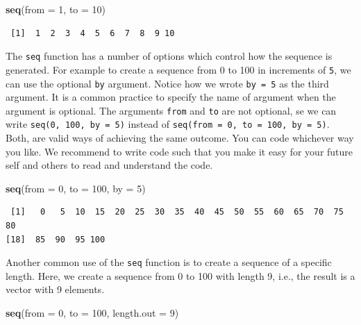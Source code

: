 \documentclass[]{book}
\newenvironment{Shaded}{\begin{snugshade}}{\end{snugshade}}
\newcommand{\KeywordTok}[1]{\textcolor[rgb]{0.13,0.29,0.53}{\textbf{#1}}}
\newcommand{\DataTypeTok}[1]{\textcolor[rgb]{0.13,0.29,0.53}{#1}}
\newcommand{\DecValTok}[1]{\textcolor[rgb]{0.00,0.00,0.81}{#1}}
\newcommand{\NormalTok}[1]{#1}
\theoremstyle{definition}
\theoremstyle{definition}
\theoremstyle{definition}
\theoremstyle{remark}
\begin{document}
\begin{Shaded}
\begin{Highlighting}[]
\KeywordTok{seq}\NormalTok{(}\DataTypeTok{from =} \DecValTok{1}\NormalTok{, }\DataTypeTok{to =} \DecValTok{10}\NormalTok{)}
\end{Highlighting}
\end{Shaded}

\begin{verbatim}
 [1]  1  2  3  4  5  6  7  8  9 10
\end{verbatim}

The \texttt{seq} function has a number of options which control how the
sequence is generated. For example to create a sequence from 0 to 100 in
increments of \texttt{5}, we can use the optional \texttt{by} argument.
Notice how we wrote \texttt{by\ =\ 5} as the third argument. It is a
common practice to specify the name of argument when the argument is
optional. The arguments \texttt{from} and \texttt{to} are not optional,
se we can write \texttt{seq(0,\ 100,\ by\ =\ 5)} instead of
\texttt{seq(from\ =\ 0,\ to\ =\ 100,\ by\ =\ 5)}. Both, are valid ways
of achieving the same outcome. You can code whichever way you like. We
recommend to write code such that you make it easy for your future self
and others to read and understand the code.

\begin{Shaded}
\begin{Highlighting}[]
\KeywordTok{seq}\NormalTok{(}\DataTypeTok{from =} \DecValTok{0}\NormalTok{, }\DataTypeTok{to =} \DecValTok{100}\NormalTok{, }\DataTypeTok{by =} \DecValTok{5}\NormalTok{)}
\end{Highlighting}
\end{Shaded}

\begin{verbatim}
 [1]   0   5  10  15  20  25  30  35  40  45  50  55  60  65  70  75  80
[18]  85  90  95 100
\end{verbatim}

Another common use of the \texttt{seq} function is to create a sequence
of a specific length. Here, we create a sequence from 0 to 100 with
length 9, i.e., the result is a vector with 9 elements.

\begin{Shaded}
\begin{Highlighting}[]
\KeywordTok{seq}\NormalTok{(}\DataTypeTok{from =} \DecValTok{0}\NormalTok{, }\DataTypeTok{to =} \DecValTok{100}\NormalTok{, }\DataTypeTok{length.out =}  \DecValTok{9}\NormalTok{)}
\end{Highlighting}
\end{Shaded}
\end{document}
